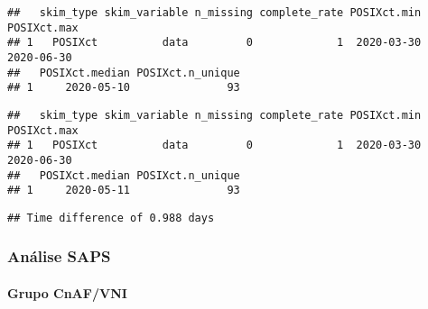 \documentclass[
]{article}
\newenvironment{Shaded}{\begin{snugshade}}{\end{snugshade}}
\newcommand{\AttributeTok}[1]{\textcolor[rgb]{0.77,0.63,0.00}{#1}}
\newcommand{\FunctionTok}[1]{\textcolor[rgb]{0.00,0.00,0.00}{#1}}
\newcommand{\NormalTok}[1]{#1}
\newcommand{\SpecialCharTok}[1]{\textcolor[rgb]{0.00,0.00,0.00}{#1}}
\newcommand{\StringTok}[1]{\textcolor[rgb]{0.31,0.60,0.02}{#1}}
\begin{document}
\begin{verbatim}
##   skim_type skim_variable n_missing complete_rate POSIXct.min POSIXct.max
## 1   POSIXct          data         0             1  2020-03-30  2020-06-30
##   POSIXct.median POSIXct.n_unique
## 1     2020-05-10               93
\end{verbatim}

\begin{Shaded}
\end{Shaded}

\begin{verbatim}
##   skim_type skim_variable n_missing complete_rate POSIXct.min POSIXct.max
## 1   POSIXct          data         0             1  2020-03-30  2020-06-30
##   POSIXct.median POSIXct.n_unique
## 1     2020-05-11               93
\end{verbatim}

\begin{Shaded}
\end{Shaded}

\begin{verbatim}
## Time difference of 0.988 days
\end{verbatim}

\hypertarget{anuxe1lise-saps}{%
\subsubsection{\texorpdfstring{\textbf{Análise
SAPS}}{Análise SAPS}}\label{anuxe1lise-saps}}

\hypertarget{grupo-cnafvni-3}{%
\paragraph{\texorpdfstring{\textbf{Grupo
CnAF/VNI}}{Grupo CnAF/VNI}}\label{grupo-cnafvni-3}}
\end{document}
